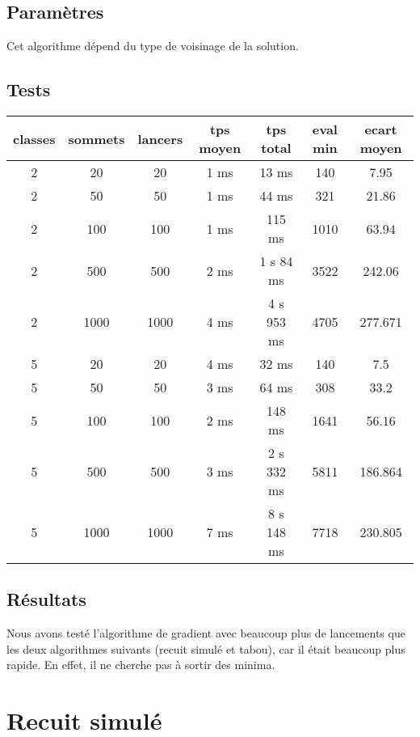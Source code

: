 \documentclass[12pt]{article}
\begin{document}
\subsection{Paramètres}
Cet algorithme dépend du type de voisinage de la solution. 

\subsection{Tests}

\begin{tabular}{|c|c|c|c|c|c|c|}
	\hline 
	classes & sommets & lancers & tps moyen & tps total & eval min & ecart moyen \\
	\hline
2 & 20 & 20 & 1 ms & 13 ms & 140 & 7.95 \\ 
	\hline
2 &  50  &  50  &  1   ms   &  44 ms   &  321  & 21.86 \\ 
	\hline
2 &  100  &  100  & 1  ms   &  115 ms    &  1010   & 63.94  \\ 
	\hline
   2 &  500  &  500  &   2 ms  &  1  s  84  ms   & 3522  & 242.06\\
   \hline
   2 &  1000  &  1000  &  4  ms & 4  s 953 ms & 4705 & 277.671 \\ 
	\hline
	\hline
5 &  20  &  20  & 4 ms &  32 ms    &  140   & 7.5 \\
	\hline
5 &  50  &  50  & 3 ms &  64 ms   & 308 & 33.2 \\ 
	\hline
5 &  100  & 100   & 2  ms   &  148 ms    & 1641 & 56.16 \\
	\hline
   5 & 500 & 500 & 3 ms   &  2 s 332 ms   &   5811  & 186.864 \\
   \hline
   5 &  1000  &  1000  & 7 ms &  8 s 148 ms & 7718 & 230.805 \\ 
	\hline
\end{tabular}

\subsection{Résultats}

Nous avons testé l’algorithme de gradient avec beaucoup plus de lancements que les deux algorithmes suivants (recuit simulé et tabou), car il était beaucoup plus rapide. En effet, il ne cherche pas à sortir des minima.

\newpage

\section{Recuit simulé}
\end{document}
